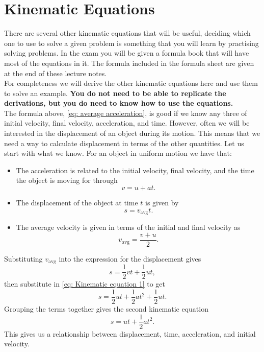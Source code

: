 \vspace{2cm}

\section{Kinematic Equations}
There are several other kinematic equations that will be useful, deciding which one to use to solve a given problem is something that you will learn by practising solving problems. In the exam you will be given a formula book that will have most of the equations in it. The formula included in the formula sheet are given at the end of these lecture notes.\\

For completeness we will derive the other kinematic equations here and use them to solve an example. \textbf{You do not need to be able to replicate the derivations, but you do need to know how to use the equations.}\\

The formula above, \cref{eq: average acceleration}, is good if we know any three of initial velocity, final velocity, acceleration, and time. However, often we will be interested in the displacement of an object during its motion. This means that we need a way to calculate displacement in terms of the other quantities.  Let us start with what we know. For an object in uniform motion we have that:
\begin{itemize}
\setlength{\itemsep}{-5pt}
    \item The acceleration is related to the initial velocity, final velocity, and the time the object is moving for through
    \begin{equation*}
        v=u+at.
    \end{equation*}
    \item The displacement of the object at time $t$ is given by
    \begin{equation*}
        s=v_{\text{avg}}t.
    \end{equation*}
    \item The average velocity is given in terms of the initial and final velocity as 
    \begin{equation*}
        v_{\text{avg}}=\frac{v+u}{2}.
    \end{equation*}
\end{itemize}
Substituting $v_{\text{avg}}$ into the expression for the displacement gives
\begin{equation*}
    s=\frac{1}{2}vt+\frac{1}{2}ut,
\end{equation*}
then substitute in \cref{eq: Kinematic equation 1} to get
\begin{equation*}
    s=\frac{1}{2}ut+\frac{1}{2}at^{2}+\frac{1}{2}ut.
\end{equation*}
Grouping the terms together gives the second kinematic equation
\begin{equation}
    s=ut+\frac{1}{2}at^{2}.
    \label{eq: Kinematic equation 2}
\end{equation}
This gives us a relationship between displacement, time, acceleration, and initial velocity.

